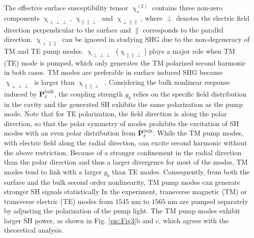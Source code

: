 \documentclass[a4paper,8pt,hyperref, twocolumn]{article}
\begin{document}
The effective surface susceptibility tensor $\upchi^{(2)}_s$ contains three non-zero components $\upchi_{\perp \perp \perp}$, $\upchi_{\parallel \parallel \perp}$ and $\upchi_{\perp \parallel \parallel}$, where $\perp$ denotes the electric field direction perpendicular to the surface and $\parallel$ corresponds to the parallel direction. 
$\upchi_{\perp \parallel \parallel}$ can be ignored in studying SHG due to the non-degeneracy of TM and TE pump modes.  
$\upchi_{\perp \perp \perp}$ ($\upchi_{\parallel \parallel \perp}$) plays a major role when TM (TE) mode is pumped, which only generates the TM polarized second harmonic in both cases. 
TM modes are preferable in surface induced SHG because $\upchi_{\perp \perp \perp}$ is larger than $\upchi_{\parallel \parallel \perp}$ \cite{rodriguez2008calibration}. 
Considering the bulk nonlinear response induced by $\mathbf{P}^{\mathrm{bulk}}_\delta$, the coupling strength $g_b$ relies on the specific field distribution in the cavity and the generated SH exhibits the same polarization as the pump mode. 
Note that for TE polarization, the field direction is along the polar direction, so that the polar symmetry of modes prohibits the excitation of SH modes with an even polar distribution from $\mathbf{P}^{\mathrm{bulk}}_\delta$. 
While the TM pump modes, with electric field along the radial direction, can excite second harmonic without the above restriction.
Because of a stronger confinement in the radial direction than the polar direction and thus a larger divergence for most of the modes, TM modes tend to link with a larger $g_b$ than TE modes. 
Consequently, from both the surface and the bulk second order nonlinearity, TM pump modes can generate stronger SH signals statistically
In the experiment, transverse magnetic (TM) or transverse electric (TE) modes from $1545$ nm to $1565$ nm are pumped separately by adjusting the polarization of the pump light.
The TM pump modes exhibit larger SH power, as shown in Fig. \ref{pic:Fig3}b and c, which agrees with the theoretical analysis.

\end{document}
